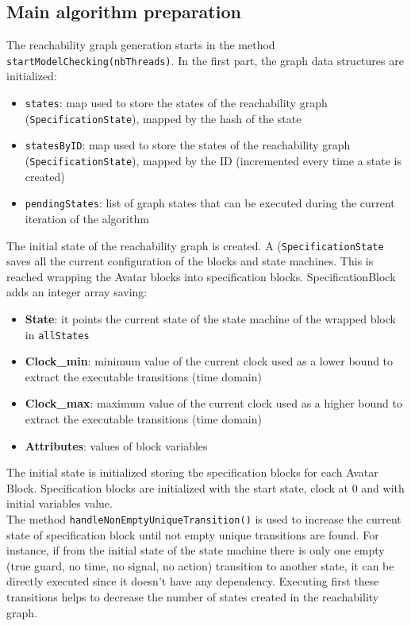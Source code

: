 \documentclass[12pt]{article}
\begin{document}
\subsection{Main algorithm preparation}
\label{sec:am_prep}
The reachability graph generation starts in the method \texttt{startModelChecking(nbThreads)}. In the first part, the graph data structures are initialized:
\begin{itemize}
\item \texttt{states}: map used to store the states of the reachability graph (\texttt{SpecificationState}), mapped by the hash of the state
\item \texttt{statesByID}: map used to store the states of the reachability graph (\texttt{SpecificationState}), mapped by the ID (incremented every time a state is created)
\item \texttt{pendingStates}: list of graph states that can be executed during the current iteration of the algorithm
\end{itemize}
The initial state of the reachability graph is created. A (\texttt{SpecificationState}  saves all the current configuration of the blocks and state machines. This is reached wrapping the Avatar blocks into specification blocks. SpecificationBlock adds an integer array saving:
\begin{itemize}
\item \textbf{State}: it points the current state of the state machine of the wrapped block in \texttt{allStates}
\item \textbf{Clock\_min}: minimum value of the current clock used as a lower bound to extract the executable transitions (time domain)
\item \textbf{Clock\_max}: maximum value of the current clock used as a higher bound to extract the executable transitions (time domain)
\item \textbf{Attributes}: values of block variables
\end{itemize}
The initial state is initialized storing the specification blocks for each Avatar Block. Specification blocks are initialized with the start state, clock at 0 and with initial variables value.\\

The method \texttt{handleNonEmptyUniqueTransition()} is used to increase the current state of specification block until not empty unique transitions are found. For instance, if from the initial state of the state machine there is only one empty (true guard, no time, no signal, no action) transition to another state, it can be directly executed since it doesn't have any dependency. Executing first these transitions helps to decrease the number of states created in the reachability graph.\\
\end{document}
